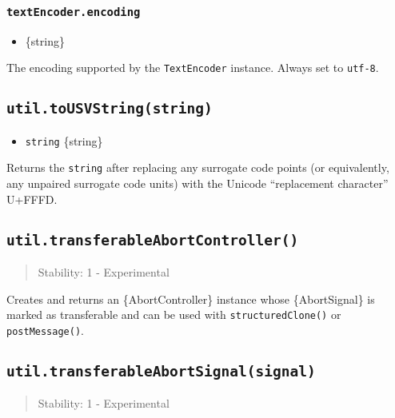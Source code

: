 \subsubsection{\texorpdfstring{\texttt{textEncoder.encoding}}{textEncoder.encoding}}\label{textencoder.encoding}

\begin{itemize}
\tightlist
\item
  \{string\}
\end{itemize}

The encoding supported by the \texttt{TextEncoder} instance. Always set
to \texttt{\textquotesingle{}utf-8\textquotesingle{}}.

\subsection{\texorpdfstring{\texttt{util.toUSVString(string)}}{util.toUSVString(string)}}\label{util.tousvstringstring}

\begin{itemize}
\tightlist
\item
  \texttt{string} \{string\}
\end{itemize}

Returns the \texttt{string} after replacing any surrogate code points
(or equivalently, any unpaired surrogate code units) with the Unicode
``replacement character'' U+FFFD.

\subsection{\texorpdfstring{\texttt{util.transferableAbortController()}}{util.transferableAbortController()}}\label{util.transferableabortcontroller}

\begin{quote}
Stability: 1 - Experimental
\end{quote}

Creates and returns an \{AbortController\} instance whose
\{AbortSignal\} is marked as transferable and can be used with
\texttt{structuredClone()} or \texttt{postMessage()}.

\subsection{\texorpdfstring{\texttt{util.transferableAbortSignal(signal)}}{util.transferableAbortSignal(signal)}}\label{util.transferableabortsignalsignal}

\begin{quote}
Stability: 1 - Experimental
\end{quote}

